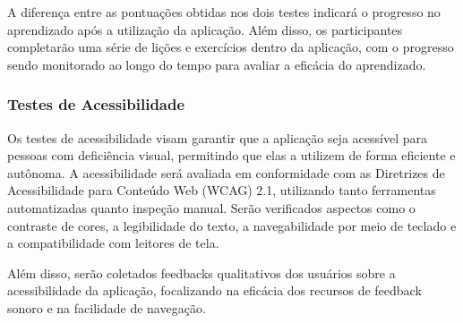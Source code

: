 A diferença entre as pontuações obtidas nos dois testes indicará o progresso no aprendizado após a utilização da aplicação. Além disso, os participantes completarão uma série de lições e exercícios dentro da aplicação, com o progresso sendo monitorado ao longo do tempo para avaliar a eficácia do aprendizado.

\subsubsection{Testes de Acessibilidade}

Os testes de acessibilidade visam garantir que a aplicação seja acessível para pessoas com deficiência visual, permitindo que elas a utilizem de forma eficiente e autônoma. A acessibilidade será avaliada em conformidade com as Diretrizes de Acessibilidade para Conteúdo Web (WCAG) 2.1, utilizando tanto ferramentas automatizadas quanto inspeção manual. Serão verificados aspectos como o contraste de cores, a legibilidade do texto, a navegabilidade por meio de teclado e a compatibilidade com leitores de tela. 

Além disso, serão coletados feedbacks qualitativos dos usuários sobre a acessibilidade da aplicação, focalizando na eficácia dos recursos de feedback sonoro e na facilidade de navegação.
